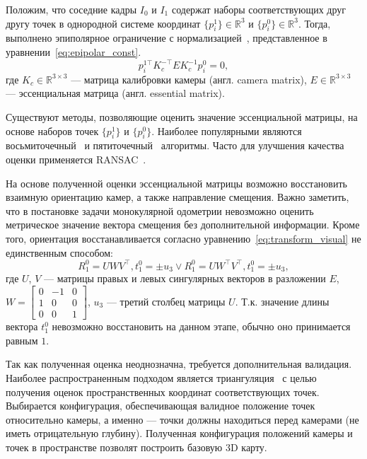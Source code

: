 Положим, что соседние кадры $I_{0}$ и $I_1$ содержат наборы соответствующих друг 
другу точек в однородной системе координат $\{p^1_i\} \in \mathbb{R}^3$ и 
$\{p^{0}_i\} \in \mathbb{R}^3$. Тогда, выполнено эпиполярное ограничение 
с нормализацией~\cite{zhang1998determining}, представленное в уравнении~\eqref{eq:epipolar_const}.
\begin{equation}
    \label{eq:epipolar_const}
    p^{1\top}_i K_c^{-\top} E K_c^{-1} p^{0}_i=0,
\end{equation}
где $K_c \in \mathbb{R}^{3\times 3}$ --- матрица калибровки камеры (англ. camera matrix), 
$E\in \mathbb{R}^{3\times 3}$ --- эссенциальная матрица (англ. essential matrix).

Существуют методы, позволяющие оценить значение эссенциальной матрицы, на 
основе наборов точек $\{p^1_i\}$ и $\{p^{0}_i\}$. Наиболее популярными являются 
восьмиточечный~\cite{hartley1997defense} и пятиточечный~\cite{nister2004efficient} 
алгоритмы. Часто для улучшения качества оценки применяется RANSAC~\cite{fischler1981random}.

На основе полученной оценки эссенциальной матрицы возможно восстановить взаимную
ориентацию камер, а также направление смещения. Важно заметить, что в постановке 
задачи монокулярной одометрии невозможно оценить метрическое значение вектора смещения
без дополнительной информации. Кроме того, ориентация восстанавливается согласно уравнению~\eqref{eq:transform_visual}
не единственным способом:
\begin{equation}
    \label{eq:transform_visual}
    R^{0}_1 = UWV^\top, t^{0}_1 = \pm u_3 \vee R^{0}_1 = UW^\top V^\top, t^{0}_1 = \pm u_3,
\end{equation}
где $U$, $V$ --- матрицы правых и левых сингулярных векторов в разложении $E$, $W = \begin{bmatrix}
    0 & -1 & 0 \\ 1 & 0 & 0 \\ 0 & 0 & 1
\end{bmatrix}$, $u_3$ --- третий столбец матрицы $U$. Т.к. значение длины вектора $t^{0}_1$
невозможно восстановить на данном этапе, обычно оно принимается равным $1$.

Так как полученная оценка неоднозначна, требуется дополнительная валидация. Наиболее
распространенным подходом является триангуляция~\cite{thurmond2001point} с целью получения оценок 
пространственных координат соответствующих точек. Выбирается конфигурация, обеспечивающая
валидное положение точек относительно камеры, а именно --- точки должны находиться перед 
камерами (не иметь отрицательную глубину). Полученная конфигурация положений камеры и
точек в пространстве позволят построить базовую 3D карту.

